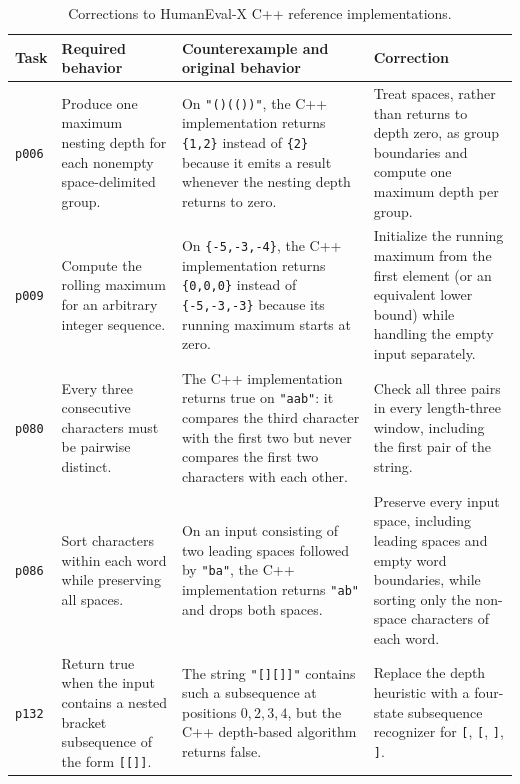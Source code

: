 \begin{table}[!t]
\centering
\caption{Corrections to HumanEval-X C++ reference implementations.}
\label{tab:humanevalx-corrections}
\scriptsize
\setlength{\tabcolsep}{3.2pt}
\renewcommand{\arraystretch}{0.90}
\begin{tabular}{L{0.07\textwidth}L{0.19\textwidth}L{0.31\textwidth}L{0.36\textwidth}}
\toprule
{}
Task & Required behavior & Counterexample and original behavior & Correction \\
\midrule
\texttt{p006} & Produce one maximum nesting depth for each nonempty
space-delimited group. & On \texttt{"()(())"}, the C++ implementation returns
\texttt{\{1,2\}} instead of \texttt{\{2\}} because it emits a result whenever
the nesting depth returns to zero. & Treat spaces, rather than returns to depth
zero, as group boundaries and compute one maximum depth per group. \\

\texttt{p009} & Compute the rolling maximum for an arbitrary integer sequence.
& On \texttt{\{-5,-3,-4\}}, the C++ implementation returns
\texttt{\{0,0,0\}} instead of \texttt{\{-5,-3,-3\}} because its running
maximum starts at zero. & Initialize the running maximum from the first element
(or an equivalent lower bound) while handling the empty input separately. \\

\texttt{p080} & Every three consecutive characters must be pairwise distinct.
& The C++ implementation returns true on \texttt{"aab"}: it compares the third
character with the first two but never compares the first two characters with
each other. & Check all three pairs in every length-three window, including the
first pair of the string. \\

\texttt{p086} & Sort characters within each word while preserving all spaces.
& On an input consisting of two leading spaces followed by \texttt{"ba"}, the
C++ implementation returns \texttt{"ab"} and drops both spaces. & Preserve
every input space, including leading spaces and empty word boundaries, while
sorting only the non-space characters of each word. \\

\texttt{p132} & Return true when the input contains a nested bracket
subsequence of the form \texttt{[[]]}. & The string \texttt{"[][]]"} contains
such a subsequence at positions $0,2,3,4$, but the C++ depth-based algorithm
returns false. & Replace the depth heuristic with a four-state subsequence
recognizer for \texttt{[}, \texttt{[}, \texttt{]}, \texttt{]}. \\


\end{tabular}
\end{table}
